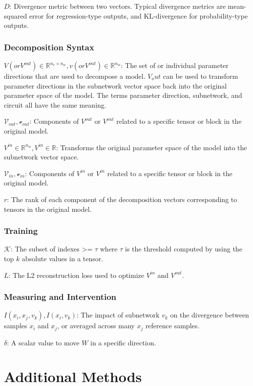 \documentclass{article}
\theoremstyle{plain}
\theoremstyle{definition}
\theoremstyle{remark}
\begin{document}
$D$: Divergence metric between two vectors. Typical divergence metrics are mean-squared error for regression-type outputs, and KL-divergence for probability-type outputs. 

\subsubsection{Decomposition Syntax}
$V (or V^{out}) \in \mathbb{R}^{n_v \times n_w}, v (or V^{out})  \in \mathbb{R}^{n_w}$: The set of or individual parameter directions that are used to decompose a model. $V_out$ can be used to transform parameter directions in the subnetwork vector space back into the original parameter space of the model. The terms parameter direction, subnetwork, and circuit all have the same meaning. 

$\mathcal{V}_{out}, \mathcal{v}_{out}$: Components of $V^{out}$ or $V^{out}$ related to a specific tensor or block in the original model. 

$V^{in} \in \mathbb{R}^{n_w}, V^{in} \in \mathbb{R}$: Transforms the original parameter space of the model into the subnetwork vector space. 

$\mathcal{V}_{in}, \mathcal{v}_{in}$: Components of $V^{in}$ or $V^{in}$ related to a specific tensor or block in the original model. 

$r$: The rank of each component of the decomposition vectors corresponding to tensors in the original model. 

\subsubsection{Training}

$\mathcal{K}$: The subset of indexes >= $\tau$ where $\tau$ is the threshold computed by using the top $k$ absolute values in a tensor. 

$L$: The L2 reconstruction loss used to optimize $V^{in}$ and $V^{out}$.

\subsubsection{Measuring and Intervention}
$I(x_i, x_j, v_k), I(x_i, v_k)$: The impact of subnetwork $v_k$ on the divergence between samples $x_i$ and $x_j$, or averaged across many $x_j$ reference samples.

$\delta$: A scalar value to move $W$ in a specific direction. 


\section{Additional Methods}
\end{document}
